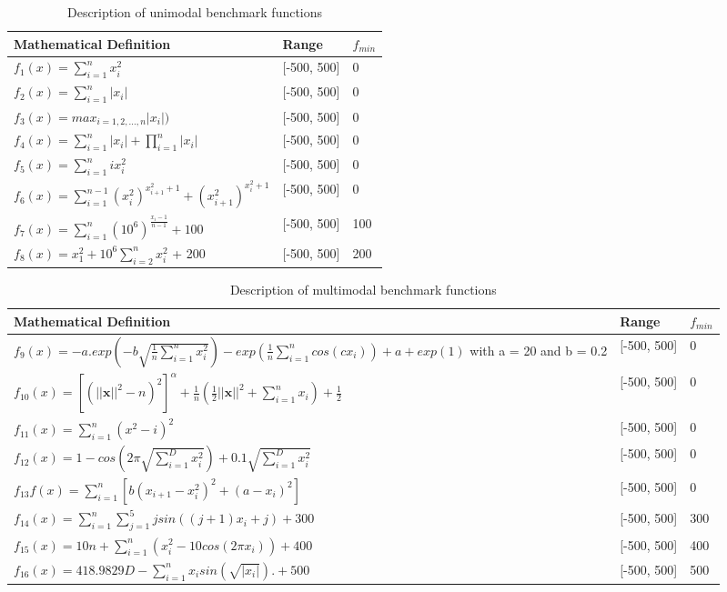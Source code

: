 \documentclass[../main.tex]{subfiles}
\begin{document}
\begin{table}[!t]
\caption{Description of unimodal benchmark functions}
\label{tbl_uni_funcs}
\centering
\begin{tabular}{p{9cm} p{2cm} p{1cm}}
 \hline Mathematical Definition & Range & $f_{min}$  \\ 
 \hline
$f_1(x) = \sum_{i=1}^n x_i^2$ & [-500, 500] & 0 \\
$f_2(x) =  \sum_{i=1}^n |x_i|$ & [-500, 500] & 0 \\
$f_3(x) =  max_{i = 1, 2,...,n}|x_i|)$ & [-500, 500] & 0 \\
$f_4(x) =  \sum_{i=1}^n |x_i| + \prod_{i=1}^n |x_i|$  & [-500, 500] & 0 \\
$f_5(x) =  \sum_{i=1}^n ix_i^2$ & [-500, 500] & 0 \\
$f_6(x) =  \sum_{i=1}^{n-1} (x_i^2)^{x_{i+1}^2+1} + (x_{i+1}^2)^{x_{i}^2+1}$ & [-500, 500] & 0 \\
$f_7(x) =  \sum_{i=1}^n (10^6)^{\frac{x_i-1}{n-1}} + 100$ & [-500, 500] & 100 \\
$f_8(x) = x_1^2 + 10^6\sum_{i=2}^n x_i^2$ + 200 & [-500, 500] & 200 \\
 \hline
\end{tabular}
\end{table}

\begin{table}[!t]
\caption{Description of multimodal benchmark functions}
\label{tbl_multi_funcs}
\centering
\begin{tabular}{p{9cm} p{2cm} p{1cm}}
 \hline 
 Mathematical Definition & Range & $f_{min}$  \\ 
 \hline
$f_9(x) = -a.exp(-b\sqrt{\frac{1}{n}\sum_{i=1}^{n}x_i^2})-exp(\frac{1}{n}\sum_{i=1}^{n}cos(cx_i))+ a + exp(1)$ with a = 20 and b = 0.2 & [-500, 500] & 0 \\
$f_{10}(x) =\left[\left(||\textbf{x}||^2 - n\right)^2\right]^\alpha + \frac{1}{n}\left(\frac{1}{2}||\textbf{x}||^2+\sum_{i=1}^{n}x_i\right)+\frac{1}{2}$ & [-500, 500] & 0 \\
$f_{11}(x) =\sum_{i=1}^{n}(x^2-i)^2$ & [-500, 500] & 0 \\
$f_{12}(x)=1-cos(2\pi\sqrt{\sum_{i=1}^{D}x_i^2})+0.1\sqrt{\sum_{i=1}^{D}x_i^2}$ & [-500, 500] & 0 \\
$f_{13}f(x)=\sum_{i=1}^{n}[b (x_{i+1} - x_i^2)^ 2 + (a - x_i)^2]$ & [-500, 500] & 0 \\
$f_{14}(x) = \sum_{i=1}^{n}{\sum_{j=1}^5{j sin((j+1)x_i+j)} + 300}$ & [-500, 500] & 300 \\
$f_{15}(x)=10n + \sum_{i=1}^{n}(x_i^2 - 10cos(2\pi x_i)) + 400$ & [-500, 500] & 400 \\
$f_{16}(x) = 418.9829D -{\sum_{i=1}^{n} x_i sin(\sqrt{|x_i|})}. + 500$ & [-500, 500] & 500 \\
\hline
\end{tabular}
\end{table}
\end{document}
